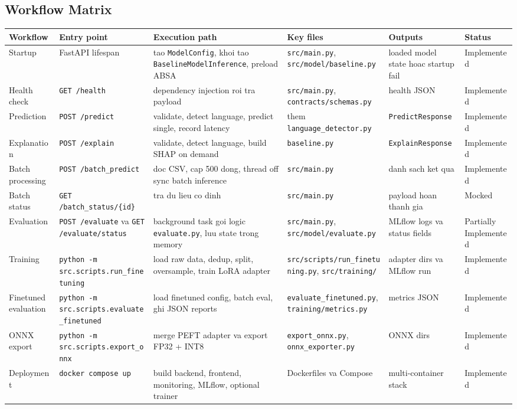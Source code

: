 \subsection{Workflow Matrix}
\begin{longtable}{@{}p{}p{}p{}p{}p{}p{}@{}}
\toprule
\textbf{Workflow} & \textbf{Entry point} & \textbf{Execution path} & \textbf{Key files} & \textbf{Outputs} & \textbf{Status} \\
\midrule
\endhead
Startup & FastAPI lifespan & tao \texttt{ModelConfig}, khoi tao \texttt{BaselineModelInference}, preload ABSA & \texttt{src/main.py}, \texttt{src/model/baseline.py} & loaded model state hoac startup fail & Implemented \\
Health check & \texttt{GET /health} & dependency injection roi tra payload & \texttt{src/main.py}, \texttt{contracts/schemas.py} & health JSON & Implemented \\
Prediction & \texttt{POST /predict} & validate, detect language, predict single, record latency & them \texttt{language\_detector.py} & \texttt{PredictResponse} & Implemented \\
Explanation & \texttt{POST /explain} & validate, detect language, build SHAP on demand & \texttt{baseline.py} & \texttt{ExplainResponse} & Implemented \\
Batch processing & \texttt{POST /batch\_predict} & doc CSV, cap 500 dong, thread off sync batch inference & \texttt{src/main.py} & danh sach ket qua & Implemented \\
Batch status & \texttt{GET /batch\_status/\{id\}} & tra du lieu co dinh & \texttt{src/main.py} & payload hoan thanh gia & Mocked \\
Evaluation & \texttt{POST /evaluate} va \texttt{GET /evaluate/status} & background task goi logic \texttt{evaluate.py}, luu state trong memory & \texttt{src/main.py}, \texttt{src/model/evaluate.py} & MLflow logs va status fields & Partially Implemented \\
Training & \texttt{python -m src.scripts.run\_finetuning} & load raw data, dedup, split, oversample, train LoRA adapter & \texttt{src/scripts/run\_finetuning.py}, \texttt{src/training/} & adapter dirs va MLflow run & Implemented \\
Finetuned evaluation & \texttt{python -m src.scripts.evaluate\_finetuned} & load finetuned config, batch eval, ghi JSON reports & \texttt{evaluate\_finetuned.py}, \texttt{training/metrics.py} & metrics JSON & Implemented \\
ONNX export & \texttt{python -m src.scripts.export\_onnx} & merge PEFT adapter va export FP32 + INT8 & \texttt{export\_onnx.py}, \texttt{onnx\_exporter.py} & ONNX dirs & Implemented \\
Deployment & \texttt{docker compose up} & build backend, frontend, monitoring, MLflow, optional trainer & Dockerfiles va Compose & multi-container stack & Implemented \\
\bottomrule
\end{longtable}

